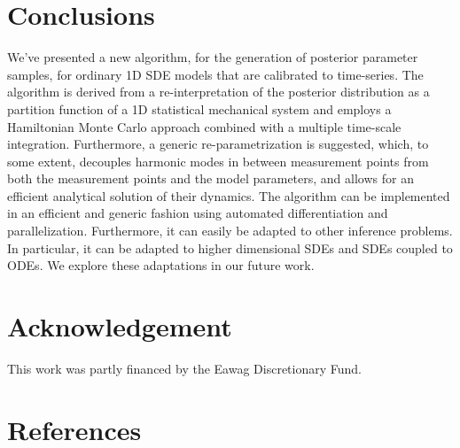 \documentclass[12pt,a4paper,final]{iopart}
\begin{document}


\section{Conclusions}

We've presented a new algorithm, for the generation of posterior parameter samples, for ordinary 1D SDE models that are calibrated to time-series.
The algorithm is derived from a re-interpretation of the posterior distribution as a partition function of a 1D statistical mechanical system and employs a Hamiltonian Monte Carlo approach combined with a multiple time-scale integration.
Furthermore, a generic re-parametrization is suggested, which, to some extent, decouples harmonic modes in between measurement points from both the measurement points and the model parameters, and allows for an efficient analytical solution of their dynamics.
The algorithm can be implemented in an efficient and generic fashion using automated differentiation and parallelization.
Furthermore, it can easily be adapted to other inference problems.
In particular, it can be adapted to higher dimensional SDEs and SDEs coupled to ODEs.
We explore these adaptations in our future work.

\section*{Acknowledgement}
This work was partly financed by the Eawag Discretionary Fund.

\section*{References}


\end{document}
